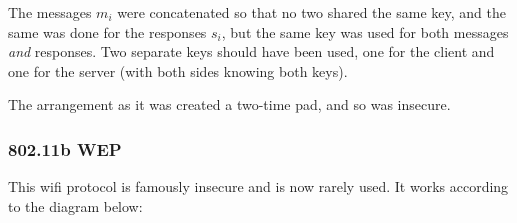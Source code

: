 \documentclass[10pt,a4paper]{report}
\begin{document}
\begin{figure}[H]
    \centering
\end{figure}

The messages $m_i$ were concatenated so that no two shared the same key, and the same was done for
the responses $s_i$, but the same key was used for both messages \textit{and} responses. Two
separate keys should have been used, one for the client and one for the server (with both sides
knowing both keys).

The arrangement as it was created a two-time pad, and so was insecure.

\subsubsection*{802.11b WEP}

This wifi protocol is famously insecure and is now rarely used. It works according to the diagram
below:
\end{document}
